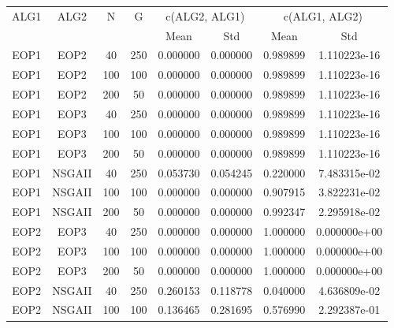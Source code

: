 \begin{table}[H]
\centering
\renewcommand{\arraystretch}{1.5}
\begin{tabular}{cccccccc}
\toprule
 \multirow{2}{*}{ALG1} &    \multirow{2}{*}{ALG2} &    \multirow{2}{*}{N} &    \multirow{2}{*}{G} &  \multicolumn{2}{c}{c(ALG2, ALG1)} &  \multicolumn{2}{c}{c(ALG1, ALG2)} \\ \cline{5-6} \cline{7-8}
   &   &   &   &  Mean &  Std &  Mean &  Std \\
\midrule
 EOP1 &    EOP2 &   40 &  250 &            0.000000 &           0.000000 &            0.989899 &       1.110223e-16 \\
 EOP1 &    EOP2 &  100 &  100 &            0.000000 &           0.000000 &            0.989899 &       1.110223e-16 \\
 EOP1 &    EOP2 &  200 &   50 &            0.000000 &           0.000000 &            0.989899 &       1.110223e-16 \\
 EOP1 &    EOP3 &   40 &  250 &            0.000000 &           0.000000 &            0.989899 &       1.110223e-16 \\
 EOP1 &    EOP3 &  100 &  100 &            0.000000 &           0.000000 &            0.989899 &       1.110223e-16 \\
 EOP1 &    EOP3 &  200 &   50 &            0.000000 &           0.000000 &            0.989899 &       1.110223e-16 \\
 EOP1 &  NSGAII &   40 &  250 &            0.053730 &           0.054245 &            0.220000 &       7.483315e-02 \\
 EOP1 &  NSGAII &  100 &  100 &            0.000000 &           0.000000 &            0.907915 &       3.822231e-02 \\
 EOP1 &  NSGAII &  200 &   50 &            0.000000 &           0.000000 &            0.992347 &       2.295918e-02 \\
 EOP2 &    EOP3 &   40 &  250 &            0.000000 &           0.000000 &            1.000000 &       0.000000e+00 \\
 EOP2 &    EOP3 &  100 &  100 &            0.000000 &           0.000000 &            1.000000 &       0.000000e+00 \\
 EOP2 &    EOP3 &  200 &   50 &            0.000000 &           0.000000 &            1.000000 &       0.000000e+00 \\
 EOP2 &  NSGAII &   40 &  250 &            0.260153 &           0.118778 &            0.040000 &       4.636809e-02 \\
 EOP2 &  NSGAII &  100 &  100 &            0.136465 &           0.281695 &            0.576990 &       2.292387e-01 \\

\end{tabular}
\end{table}
